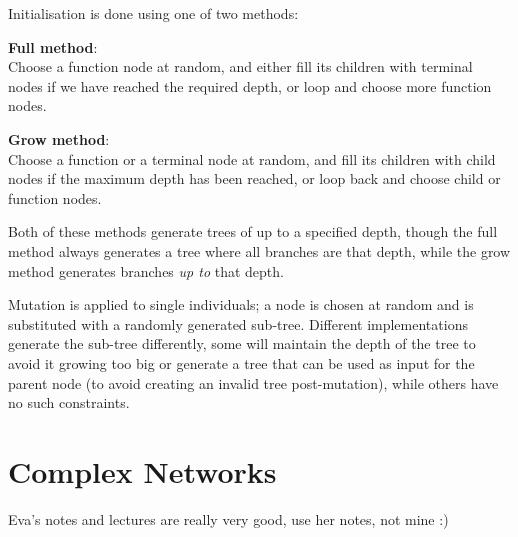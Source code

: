 Initialisation is done using one of two methods:

\begin{description}
\item \textbf{Full method}:\\ Choose a function node at random, and
either fill its children with terminal nodes if we have reached the
required depth, or loop and choose more function nodes.
\item \textbf{Grow method}:\\ Choose a function or a terminal node at
random, and fill its children with child nodes if the maximum depth
has been reached, or loop back and choose child or function nodes.
\end{description}

Both of these methods generate trees of up to a specified depth,
though the full method always generates a tree where all branches are
that depth, while the grow method generates branches \textit{up to}
that depth.

Mutation is applied to single individuals; a node is chosen at random
and is substituted with a randomly generated sub-tree. Different
implementations generate the sub-tree differently, some will maintain
the depth of the tree to avoid it growing too big or generate a tree
that can be used as input for the parent node (to avoid creating an
invalid tree post-mutation), while others have no such constraints.




\section{Complex Networks}

Eva's notes and lectures are really very good, use her notes, not mine :)
